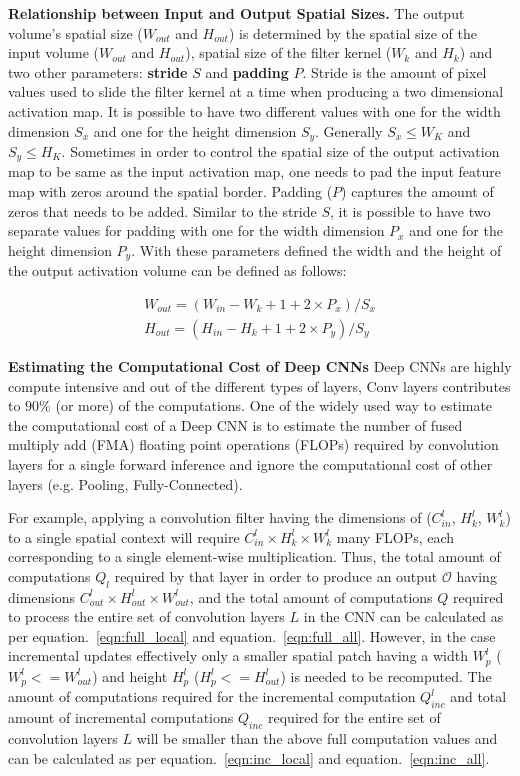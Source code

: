 \vspace{2mm}
\noindent \textbf{Relationship between Input and Output Spatial Sizes.} The output volume's spatial size ($W_{out}$ and $H_{out}$) is determined by the spatial size of the input volume ($W_{out}$ and $H_{out}$), spatial size of the filter kernel ($W_k$ and $H_k$) and two other parameters: \textbf{stride} $S$ and \textbf{padding} $P$. Stride is the amount of pixel values used to slide the filter kernel at a time when producing a two dimensional activation map. It is possible to have two different values with one for the width dimension $S_x$ and one for the height dimension $S_y$. Generally $S_x \leq W_K$ and $S_y \leq H_K$. Sometimes in order to control the spatial size of the output activation map to be same as the input activation map, one needs to pad the input feature map with zeros around the spatial border. Padding ($P$) captures the amount of zeros that needs to be added. Similar to the stride $S$, it is possible to have two separate values for padding with one for the width dimension $P_x$ and one for the height dimension $P_y$. With these parameters defined the width and the height of the output activation volume can be defined as follows:

\begin{align}
W_{out} = (W_{in} - W_k + 1 + 2\times P_x)/S_x \\
H_{out} = (H_{in} - H_k + 1 + 2\times P_y)/S_y
\end{align}

\vspace{2mm}
\noindent \textbf{Estimating the Computational Cost of Deep CNNs}
Deep CNNs are highly compute intensive and out of the different types of layers, Conv layers contributes to $90\%$ (or more) of the computations. One of the widely used way to estimate the computational cost of a Deep CNN is to estimate the number of fused multiply add (FMA) floating point operations (FLOPs) required by convolution layers for a single forward inference and ignore the computational cost of other layers (e.g. Pooling, Fully-Connected).

For example, applying a convolution filter having the dimensions of ($C^l_{in}$, $H^l_{k}$, $W^l_{k}$) to a single spatial context will require $C^l_{in} \times H^l_{k} \times W^l_{k}$ many FLOPs, each corresponding to a single element-wise multiplication. Thus, the total amount of computations $Q_l$ required by that layer in order to produce an output $\mathcal{O}$ having dimensions $C^l_{out} \times H^l_{out} \times W^l_{out}$, and the total amount of computations $Q$ required to process the entire set of convolution layers $L$ in the CNN can be calculated as per equation.~\ref{eqn:full_local} and equation.~\ref{eqn:full_all}. However, in the case incremental updates effectively only a smaller spatial patch having a width $W^l_p$ ($W^l_p<=W^l_{out}$) and height $H^l_p$ ($H^l_p<=H^l_{out}$) is needed to be recomputed. The amount of computations required for the incremental computation $Q^l_{inc}$ and total amount of incremental computations $Q_{inc}$ required for the entire set of convolution layers $L$ will be smaller than the above full computation values and can be calculated as per equation.~\ref{eqn:inc_local} and equation.~\ref{eqn:inc_all}.

